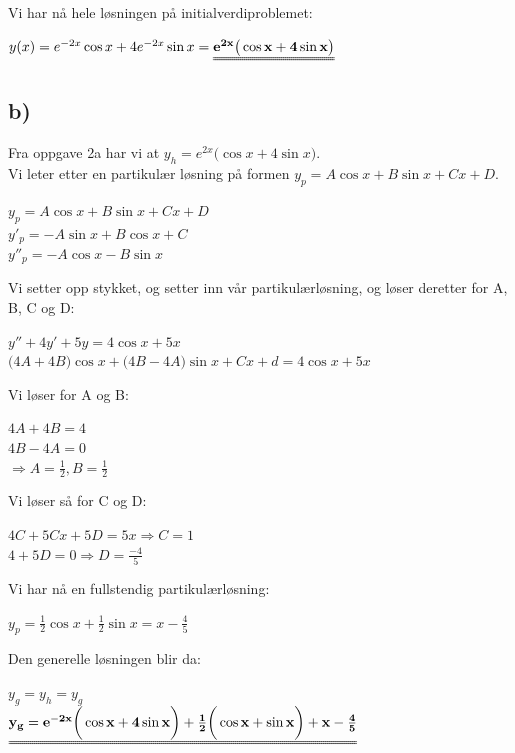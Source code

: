 \documentclass[12pt,norsk,a4paper]{article}
\begin{document}
Vi har nå hele løsningen på initialverdiproblemet: 
\begin{center}
$y(x) = e^{-2x} \cos x + 4 e^{-2x} \sin x = \mathbf{\uuline{e^{2x} \big(\cos x + 4 \sin x \big)}}$
\end{center}
\clearpage

\subsection{b)} %
\label{sub:2_b_}
Fra oppgave 2a har vi at $y_h = e^{2x} \big(\cos x + 4 \sin x \big)$.\\
Vi leter etter en partikulær løsning på formen $y_p = A \cos x + B \sin x + Cx + D$.\\
\begin{center}
$y_p = A \cos x + B \sin x + Cx + D$\\
$y'_p = -A \sin x + B \cos x + C$\\
$y''_p = -A \cos x - B \sin x$\\[1cm]
\end{center}
Vi setter opp stykket, og setter inn vår partikulærløsning, og løser deretter for A, B, C og D:
\begin{center}
$y'' + 4y' + 5y = 4 \cos x + 5 x$\\
$\big(4A + 4B\big) \cos x + \big( 4B -4 A\big) \sin x + Cx + d = 4 \cos x + 5 x$\\
\end{center}
Vi løser for A og B:
\begin{center}
$4A + 4B = 4$\\
$4B - 4A = 0$\\
$\Rightarrow A = \frac{1}{2} , B = \frac{1}{2}$
\end{center}
Vi løser så for C og D:
\begin{center}
$4C + 5Cx + 5D = 5x \Rightarrow C = 1$\\
$4 + 5D = 0 \Rightarrow D = \frac{-4}{5}$
\end{center}

Vi har nå en fullstendig partikulærløsning:
\begin{center}
$y_p = \frac{1}{2} \cos x + \frac{1}{2} \sin x = x - \frac{4}{5}$
\end{center}
Den generelle løsningen blir da:
\begin{center}
$y_g = y_h = y_g$\\[0.3cm]
$\mathbf{\uuline{y_g = e^{-2x} \bigg(\cos x + 4 \sin x \bigg) + \frac{1}{2}\bigg( \cos x + \sin x \bigg) + x - \frac{4}{5}}}$
\end{center}
\end{document}
